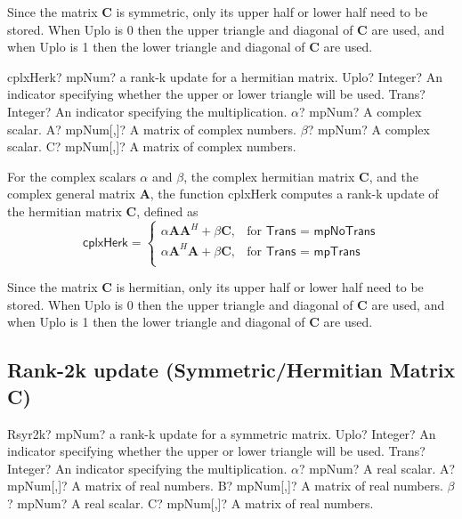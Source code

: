 Since the matrix $\boldsymbol{C}$ is symmetric, only its upper half or lower half need to be stored. When \textsf{Uplo} is 0 then the upper triangle and diagonal of $\boldsymbol{C}$ are used, and when \textsf{Uplo} is 1 then the lower triangle and diagonal of $\boldsymbol{C}$ are used. 


\newpage
\begin{mpFunctionsExtract}
	\mpFunctionSix
	{cplxHerk? mpNum? a rank-k update for a hermitian matrix.}
	{Uplo? Integer? An indicator specifying whether the upper or lower triangle will be used.}
	{Trans? Integer? An indicator specifying the multiplication.}
	{$\alpha$? mpNum? A complex scalar.}
	{A? mpNum[,]? A matrix of complex numbers.}
	{$\beta$? mpNum? A complex scalar.}
	{C? mpNum[,]? A matrix of complex numbers.}
\end{mpFunctionsExtract}

\vspace{0.3cm}
For the complex scalars $\alpha$ and $\beta$, the complex hermitian matrix $\boldsymbol{C}$, and the complex general matrix $\boldsymbol{A}$, the function \textsf{cplxHerk} computes a rank-k update of the hermitian matrix $\boldsymbol{C}$, defined as 
\begin{equation}
\textsf{cplxHerk}=\begin{cases}
\alpha \boldsymbol{A} \boldsymbol{A}^H + \beta \boldsymbol{C}, & \text{for } \textsf{Trans = mpNoTrans} \\
\alpha \boldsymbol{A}^H \boldsymbol{A} + \beta \boldsymbol{C}, & \text{for } \textsf{Trans = mpTrans} \\
\end{cases}
\end{equation}

Since the matrix $\boldsymbol{C}$ is hermitian, only its upper half or lower half need to be stored. When \textsf{Uplo} is 0 then the upper triangle and diagonal of $\boldsymbol{C}$ are used, and when \textsf{Uplo} is 1 then the lower triangle and diagonal of $\boldsymbol{C}$ are used. 





\newpage
\subsection{Rank-2k update (Symmetric/Hermitian Matrix C)}


\begin{mpFunctionsExtract}
	\mpFunctionSeven
	{Rsyr2k? mpNum? a rank-k update for a symmetric matrix.}
	{Uplo? Integer? An indicator specifying whether the upper or lower triangle will be used.}
	{Trans? Integer? An indicator specifying the multiplication.}
	{$\alpha$? mpNum? A real scalar.}
	{A? mpNum[,]? A matrix of real numbers.}
	{B? mpNum[,]? A matrix of real numbers.}
	{$\beta$? mpNum? A real scalar.}
	{C? mpNum[,]? A matrix of real numbers.}
\end{mpFunctionsExtract}

